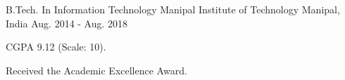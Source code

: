

\begin{cventries}

  \cventry
    {B.Tech. In Information Technology} %
    {Manipal Institute of Technology} %
    {Manipal, India} %
    {Aug. 2014 - Aug. 2018} %
    {
      \begin{cvitems} %
		\item {CGPA 9.12 (Scale: 10).}
	  	\item {Received the Academic Excellence Award.}
      \end{cvitems}
    }

\end{cventries}
